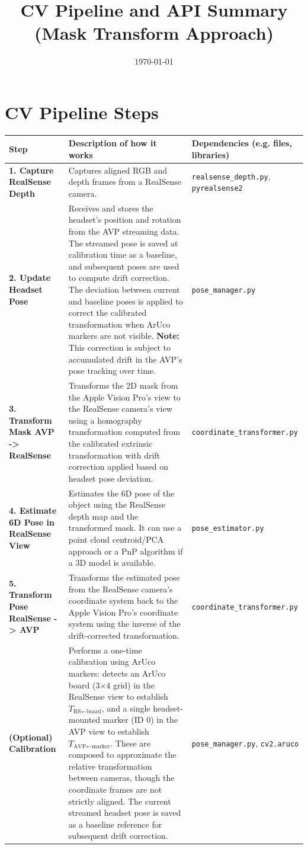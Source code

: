 \documentclass{article}
\title{CV Pipeline and API Summary (Mask Transform Approach)}
\author{}
\date{\today}
\begin{document}
\maketitle

\section*{CV Pipeline Steps}

\begin{longtable}{| >{\raggedright\arraybackslash}p{} | >{\raggedright\arraybackslash}p{} | >{\raggedright\arraybackslash}p{} |}
\hline
\textbf{Step} & \textbf{Description of how it works} & \textbf{Dependencies (e.g. files, libraries)} \\
\hline
\endhead

\textbf{1. Capture RealSense Depth} & Captures aligned RGB and depth frames from a RealSense camera. & \texttt{realsense\_depth.py}, \texttt{pyrealsense2} \\
\hline
\textbf{2. Update Headset Pose} & Receives and stores the headset's position and rotation from the AVP streaming data. The streamed pose is saved at calibration time as a baseline, and subsequent poses are used to compute drift correction. The deviation between current and baseline poses is applied to correct the calibrated transformation when ArUco markers are not visible. \textbf{Note:} This correction is subject to accumulated drift in the AVP's pose tracking over time. & \texttt{pose\_manager.py} \\
\hline
\textbf{3. Transform Mask AVP -> RealSense} & Transforms the 2D mask from the Apple Vision Pro's view to the RealSense camera's view using a homography transformation computed from the calibrated extrinsic transformation with drift correction applied based on headset pose deviation. & \texttt{coordinate\_transformer.py} \\
\hline
\textbf{4. Estimate 6D Pose in RealSense View} & Estimates the 6D pose of the object using the RealSense depth map and the transformed mask. It can use a point cloud centroid/PCA approach or a PnP algorithm if a 3D model is available. & \texttt{pose\_estimator.py} \\
\hline
\textbf{5. Transform Pose RealSense -> AVP} & Transforms the estimated pose from the RealSense camera's coordinate system back to the Apple Vision Pro's coordinate system using the inverse of the drift-corrected transformation. & \texttt{coordinate\_transformer.py} \\
\hline
\textbf{(Optional) Calibration} & Performs a one-time calibration using ArUco markers: detects an ArUco board (3$\times$4 grid) in the RealSense view to establish $T_{\text{RS} \leftarrow \text{board}}$, and a single headset-mounted marker (ID 0) in the AVP view to establish $T_{\text{AVP} \leftarrow \text{marker}}$. These are composed to approximate the relative transformation between cameras, though the coordinate frames are not strictly aligned. The current streamed headset pose is saved as a baseline reference for subsequent drift correction. & \texttt{pose\_manager.py}, \texttt{cv2.aruco} \\
\hline
\end{longtable}
\end{document}
